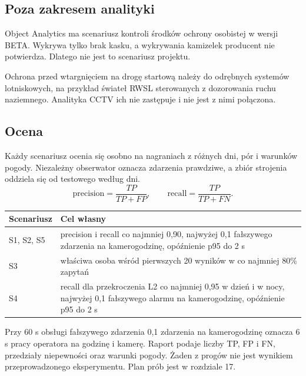 
\subsection*{Poza zakresem analityki}
Object Analytics ma scenariusz kontroli środków ochrony osobistej w wersji BETA. Wykrywa tylko brak kasku, a wykrywania kamizelek producent nie potwierdza. Dlatego nie jest to scenariusz projektu.\cite{S-AOA2}

Ochrona przed wtargnięciem na drogę startową należy do odrębnych systemów lotniskowych, na przykład świateł RWSL sterowanych z dozorowania ruchu naziemnego. Analityka CCTV ich nie zastępuje i nie jest z nimi połączona.\cite{S-RWSL}

\subsection*{Ocena}
Każdy scenariusz ocenia się osobno na nagraniach z różnych dni, pór i warunków pogody. Niezależny obserwator oznacza zdarzenia prawdziwe, a zbiór strojenia oddziela się od testowego według dni.
\[
\mathrm{precision}=\frac{TP}{TP+FP},\qquad
\mathrm{recall}=\frac{TP}{TP+FN}.
\]
\begin{center}
\small
\begin{tabularx}{\linewidth}{@{}lY@{}}
\toprule
Scenariusz & Cel własny \\
\midrule
S1, S2, S5 & precision i recall co najmniej 0,90, najwyżej 0,1 fałszywego zdarzenia na kamerogodzinę, opóźnienie p95 do 2 s \\
S3 & właściwa osoba wśród pierwszych 20 wyników w co najmniej 80\% zapytań \\
S4 & recall dla przekroczenia L2 co najmniej 0,95 w dzień i w nocy, najwyżej 0,1 fałszywego alarmu na kamerogodzinę, opóźnienie p95 do 2 s \\
\bottomrule
\end{tabularx}
\end{center}
Przy 60 s obsługi fałszywego zdarzenia 0,1 zdarzenia na kamerogodzinę oznacza 6 s pracy operatora na godzinę i kamerę. Raport podaje liczby TP, FP i FN, przedziały niepewności oraz warunki pogody. Żaden z progów nie jest wynikiem przeprowadzonego eksperymentu. Plan prób jest w rozdziale 17.\cite{OWN}

